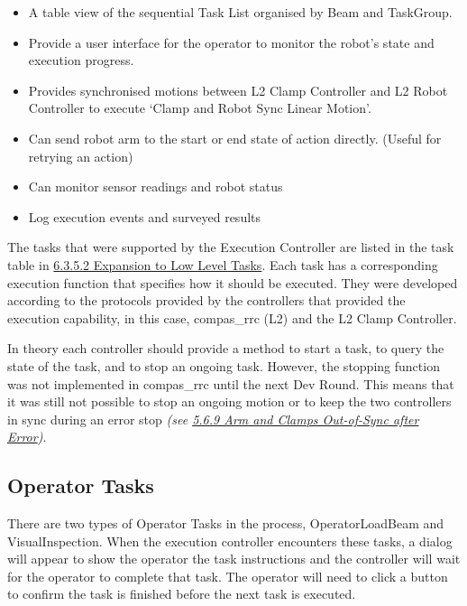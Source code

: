 \documentclass[11pt]{book}
\begin{document}
\begin{itemize}
	\item A table view of the sequential Task List organised by Beam and TaskGroup. 

	\item Provide a user interface for the operator to monitor the robot's state and execution progress.

	\item Provides synchronised motions between L2 Clamp Controller and L2 Robot Controller to execute ‘Clamp and Robot Sync Linear Motion’.

	\item Can send robot arm to the start or end state of action directly. (Useful for retrying an action)

	\item Can monitor sensor readings and robot status

	\item Log execution events and surveyed results

\end{itemize}
The tasks that were supported by the Execution Controller are listed in the task table in \uline{6.3.5.2 Expansion to Low Level Tasks}. Each task has a corresponding execution function that specifies how it should be executed. They were developed according to the protocols provided by the controllers that provided the execution capability, in this case, compas\_rrc (L2) and the L2 Clamp Controller. 

In theory each controller should provide a method to start a task, to query the state of the task, and to stop an ongoing task. However, the stopping function was not implemented in compas\_rrc until the next Dev Round. This means that it was still not possible to stop an ongoing motion or to keep the two controllers in sync during an error stop \textit{\textcolor[HTML]{B7B7B7}{(see \uline{5.6.9 Arm and Clamps Out-of-Sync after Error})}}.

\subsection{Operator Tasks}

There are two types of Operator Tasks in the process, OperatorLoadBeam and VisualInspection. When the execution controller encounters these tasks, a dialog will appear to show the operator the task instructions and the controller will wait for the operator to complete that task. The operator will need to click a button to confirm the task is finished before the next task is executed. 
\end{document}

